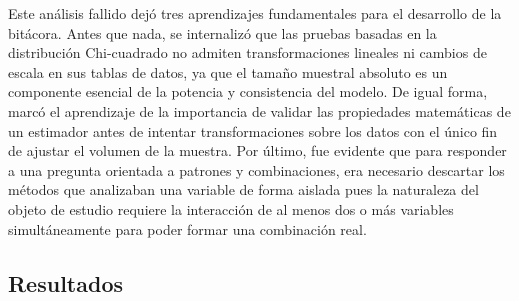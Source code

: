 \documentclass[12pt]{article}
\begin{document}
Este análisis fallido dejó tres aprendizajes fundamentales para el desarrollo de la bitácora. Antes que nada, se internalizó que las pruebas basadas en la distribución Chi-cuadrado no admiten transformaciones lineales ni cambios de escala en sus tablas de datos, ya que el tamaño muestral absoluto es un componente esencial de la potencia y consistencia del modelo. De igual forma, marcó el aprendizaje de la importancia de validar las propiedades matemáticas de un estimador antes de intentar transformaciones sobre los datos con el único fin de ajustar el volumen de la muestra. Por último, fue evidente que para responder a una pregunta orientada a patrones y combinaciones, era necesario descartar los métodos que analizaban una variable de forma aislada pues la naturaleza del objeto de estudio requiere la interacción de al menos dos o más variables simultáneamente para poder formar una combinación real. 

\subsection{Resultados}
\end{document}
